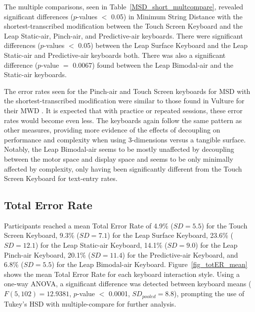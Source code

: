 The multiple comparisons, seen in Table~\ref{MSD_short_multcompare}, revealed significant differences ($p$-values $<$ 0.05) in Minimum String Distance with the shortest-transcribed modification between the Touch Screen Keyboard and the Leap Static-air, Pinch-air, and Predictive-air keyboards. There were significant differences ($p$-values $<$ 0.05) between the Leap Surface Keyboard and the Leap Static-air and Predictive-air keyboards both. There was also a significant difference ($p$-value $=$ 0.0067) found between the Leap Bimodal-air and the Static-air keyboards.

The error rates seen for the Pinch-air and Touch Screen keyboards for MSD with the shortest-transcribed modification were similar to those found in Vulture for their MWD \cite{ref_vulture}. It is expected that with practice or repeated sessions, these error rates would become even less. The keyboards again follow the same pattern as other measures, providing more evidence of the effects of decoupling on performance and complexity when using 3-dimensions versus a tangible surface. Notably, the Leap Bimodal-air seems to be mostly unaffected by decoupling between the motor space and display space and seems to be only minimally affected by complexity, only having been significantly different from the Touch Screen Keyboard for text-entry rates.

\subsection{Total Error Rate}
Participants reached a mean Total Error Rate of 4.9\% ($SD = 5.5$) for the Touch Screen Keyboard, 9.3\% ($SD = 7.1$) for the Leap Surface Keyboard, 23.6\% ($SD = 12.1$) for the Leap Static-air Keyboard, 14.1\% ($SD = 9.0$) for the Leap Pinch-air Keyboard, 20.1\% ($SD = 11.4$) for the Predictive-air Keyboard, and 6.8\% ($SD = 5.5$) for the Leap Bimodal-air Keyboard. Figure~\ref{fig_totER_mean} shows the mean Total Error Rate for each keyboard interaction style. Using a one-way ANOVA, a significant difference was detected between keyboard means ($F(5, 102) = 12.9381$, $p$-value $<$ 0.0001, $SD_{pooled} = 8.8$), prompting the use of Tukey's HSD with multiple-compare for further analysis.


